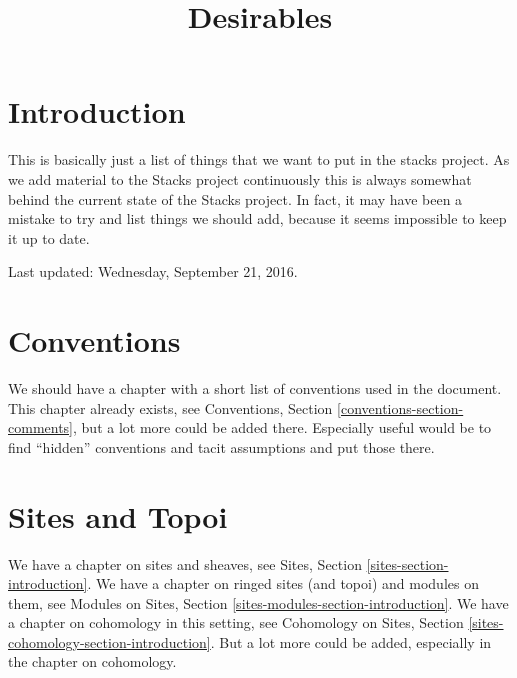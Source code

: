 

%


\title{Desirables}

\maketitle

\label{section-phantom}


\tableofcontents

\section{Introduction}
\label{section-introduction}

\noindent
This is basically just a list of things that we want to put in the stacks
project. As we add material to the Stacks project continuously this is always
somewhat behind the current state of the Stacks project. In fact, it may have
been a mistake to try and list things we should add, because it seems
impossible to keep it up to date.

\medskip\noindent
Last updated: Wednesday, September 21, 2016.


\section{Conventions}
\label{section-conventions}

\noindent
We should have a chapter with a short list of conventions used in the document.
This chapter already exists, see
Conventions, Section \ref{conventions-section-comments},
but a lot more could be added there. Especially useful would be to find
``hidden'' conventions and tacit assumptions and put those there.


\section{Sites and Topoi}
\label{section-sites}

\noindent
We have a chapter on sites and sheaves, see
Sites, Section \ref{sites-section-introduction}.
We have a chapter on ringed sites (and topoi) and modules on them, see
Modules on Sites, Section \ref{sites-modules-section-introduction}.
We have a chapter on cohomology in this setting, see
Cohomology on Sites, Section \ref{sites-cohomology-section-introduction}.
But a lot more could be added, especially in the chapter on cohomology.


